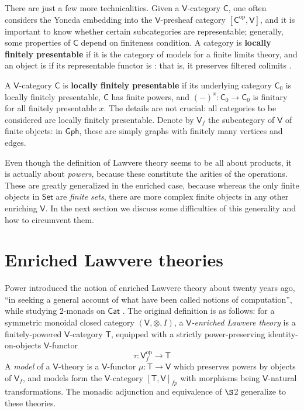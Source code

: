 \documentclass{amsart}
\newcommand{\define}[1]{{\bf \boldmath{#1}}}
\theoremstyle{definition}
\newcommand{\Gph}{\mathsf{Gph}}
\newcommand{\Set}{\mathsf{Set}}
\newcommand{\Cat}{\mathsf{Cat}}
\newcommand{\V}{\mathsf{V}}
\newcommand{\C}{\mathsf{C}}
\newcommand{\T}{\mathsf{T}}
\newcommand{\op}{\mathrm{op}}
\newcommand{\maps}{\colon}
\begin{document}
There are just a few more technicalities. Given a $\V$-category $\C$, one often considers the Yoneda embedding into the $\V$-presheaf category $[\C^\op, \V]$, and it is important to know whether certain subcategories are representable; generally, some properties of $\C$ depend on finiteness condition. A category is \textbf{locally finitely presentable} if it is the category of models for a finite limits
theory, and an object is \define{finite} if its representable functor is \define{finitary}: that is, it preserves filtered colimits \cite{adamekrosicky}.

A $\V$-category $\C$ is \textbf{locally finitely presentable} if its underlying category $\C_0$ is locally finitely presentable, $\C$ has finite powers, and $(-)^x\maps \C_0 \to \C_0$ is finitary for all finitely presentable $x$.  The details are not crucial: all categories to be considered are locally finitely presentable. Denote by $\V_f$ the subcategory of $\V$ of finite objects: in $\Gph$, these are simply graphs with finitely many vertices and edges.

Even though the definition of Lawvere theory seems to be all about products, it is actually about \textit{powers}, because these constitute the arities of the operations. These are greatly generalized in the enriched case, because whereas the only finite objects in $\Set$ are \textit{finite sets}, there are more complex finite objects in any other enriching $\V$.  In the next section we discuss some difficulties of this generality and how to circumvent them.

\section{Enriched Lawvere theories}
Power introduced the notion of enriched Lawvere theory about twenty years ago, ``in seeking a general account of what have been called notions of computation'', while studying 2-monads on $\Cat$ \cite{power}. The original definition is as follows: for a symmetric monoidal closed category $(\V,\otimes,I)$, a \textit{$\V$-enriched Lawvere theory} is a finitely-powered $\V$-category $\T$, equipped with a strictly power-preserving identity-on-objects $\V$-functor $$\tau\maps\V_f^\op \to \T$$ A \textit{model} of a $\V$-theory is a $\V$-functor $\mu\maps\T \to \V$ which preserves powers by objects of $\V_f$, and models form the $\V$-category $[\T,\V]_{fp}$ with morphisms being $\V$-natural transformations. The monadic adjunction and equivalence of $\S$2 generalize to these theories.
\end{document}
